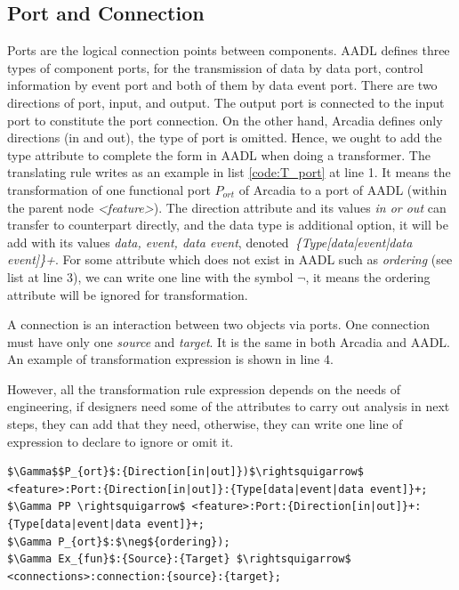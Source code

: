 


\subsection{Port and Connection}
Ports are the logical connection points between components. AADL defines three types of component ports, for the transmission of data by data port, control information by event port and both of them by data event port. There are two directions of port, input, and output. The output port is connected to the input port to constitute the port connection. On the other hand, Arcadia defines only directions (in and out), the type of port is omitted. Hence, we ought to add the type attribute to complete the form in AADL when doing a transformer. The translating rule writes as an example in list \ref{code:T_port} at line 1. It means the transformation of one functional port $P_{ort}$ of Arcadia to a port of AADL (within the parent node \textit{<feature>}). The direction attribute and its values \textit{in or out} can transfer to counterpart directly, and the data type is additional option, it will be add with its values \textit{data, event, data event}, denoted~\textit{\{Type[data|event|data event]\}+}. For some attribute which does not exist in AADL such as \textit{ordering} (see list at line 3), we can write one line with the symbol $\neg$, it means the ordering attribute will be ignored for transformation. 

A connection is an interaction between two objects via ports. One connection must have only one \textit{source} and \textit{target}. It is the same in both Arcadia and AADL. An example of transformation expression is shown in line 4. 

However, all the transformation rule expression depends on the needs of engineering, if designers need some of the attributes to carry out analysis in next steps, they can add that they need, otherwise, they can write one line of expression to declare to ignore or omit it. 


\begin{lstlisting}[caption={An example of transformation rules}, label=code:T_port,mathescape=true]
$\Gamma$$P_{ort}$:{Direction[in|out]})$\rightsquigarrow$ <feature>:Port:{Direction[in|out]}:{Type[data|event|data event]}+;
$\Gamma PP \rightsquigarrow$ <feature>:Port:{Direction[in|out]}+:{Type[data|event|data event]}+;
$\Gamma P_{ort}$:$\neg${ordering});
$\Gamma Ex_{fun}$:{Source}:{Target} $\rightsquigarrow$ <connections>:connection:{source}:{target}; 
\end{lstlisting}

